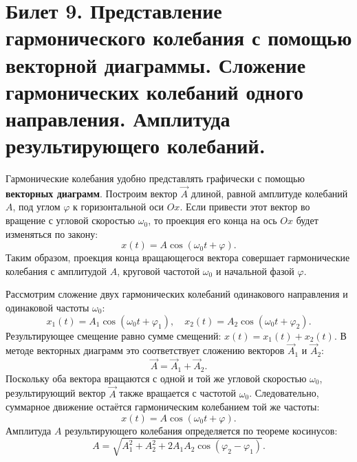 \section{Билет 9. Представление гармонического колебания с помощью векторной диаграммы. Сложение гармонических колебаний одного направления. Амплитуда результирующего колебаний.}

\begin{definition}
Гармонические колебания удобно представлять графически с помощью \textbf{векторных диаграмм}. Построим вектор $\vec{A}$ длиной, равной амплитуде колебаний $A$, под углом $\varphi$ к горизонтальной оси $Ox$. Если привести этот вектор во вращение с угловой скоростью $\omega_0$, то проекция его конца на ось $Ox$ будет изменяться по закону:
\begin{equation}
    x(t) = A \cos(\omega_0 t + \varphi). \label{eq:vector_diag}
\end{equation}
Таким образом, проекция конца вращающегося вектора совершает гармонические колебания с амплитудой $A$, круговой частотой $\omega_0$ и начальной фазой $\varphi$.
\end{definition}

\begin{theorem}
Рассмотрим сложение двух гармонических колебаний одинакового направления и одинаковой частоты $\omega_0$:
\begin{equation}
    x_1(t) = A_1 \cos(\omega_0 t + \varphi_1), \quad x_2(t) = A_2 \cos(\omega_0 t + \varphi_2).
\end{equation}
Результирующее смещение равно сумме смещений: $x(t) = x_1(t) + x_2(t)$. В методе векторных диаграмм это соответствует сложению векторов $\vec{A}_1$ и $\vec{A}_2$:
\begin{equation}
    \vec{A} = \vec{A}_1 + \vec{A}_2.
\end{equation}
Поскольку оба вектора вращаются с одной и той же угловой скоростью $\omega_0$, результирующий вектор $\vec{A}$ также вращается с частотой $\omega_0$. Следовательно, суммарное движение остаётся гармоническим колебанием той же частоты:
\begin{equation}
    x(t) = A \cos(\omega_0 t + \varphi). \label{eq:res_osc}
\end{equation}
Амплитуда $A$ результирующего колебания определяется по теореме косинусов:
\begin{equation}
    A = \sqrt{A_1^2 + A_2^2 + 2A_1 A_2 \cos(\varphi_2 - \varphi_1)}. \label{eq:amplitude_sum}
\end{equation}
\end{theorem}

